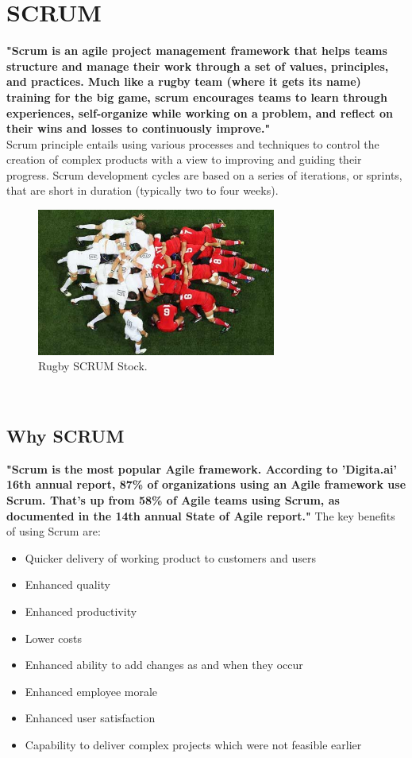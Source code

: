 \section{SCRUM}
\textbf{"Scrum is an agile project management framework that helps teams structure and manage their work through a set of values, principles, and practices. Much like a rugby team (where it gets its name) training for the big game, scrum encourages teams to learn through experiences, self-organize while working on a problem, and reflect on their wins and losses to continuously improve."}\cite{samplewebs1}\\
Scrum principle entails using various processes and techniques to control the creation of complex products with a view to improving and guiding their progress.
Scrum development cycles are based on a series of iterations, or sprints, that are short in duration (typically two to four weeks).
\begin{figure}[h]
    \centering
    \includegraphics[width=0.7\textwidth]{figures/rugbystock.jpg} 
    \caption{Rugby SCRUM Stock.}
\end{figure} \
\subsection{Why SCRUM}
\textbf{"Scrum is the most popular Agile framework. According to 'Digita.ai' 16th annual report, 87\% of organizations using an Agile framework use Scrum. That’s up from 58\% of Agile teams using Scrum, as documented in the 14th annual State of Agile report."\cite{samplewebs2}} 
The key benefits of using Scrum are:

\begin{itemize}
    \item Quicker delivery of working product to customers and users
    \item Enhanced quality
    \item Enhanced productivity
    \item Lower costs
    \item Enhanced ability to add changes as and when they occur
    \item Enhanced employee morale
    \item Enhanced user satisfaction
    \item Capability to deliver complex projects which were not feasible earlier
\end{itemize}
